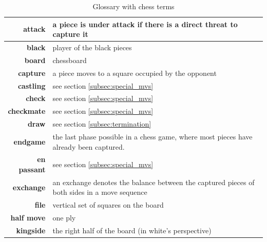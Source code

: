 \begin{table}[]
\centering
\caption{Glossary with chess terms}
\label{tab:gls}
\begin{tabular}{rL{10cm}}
\hline
\textbf{attack}       & a piece is under attack if there is a direct threat to capture it \\ \hline
\textbf{black}        & player of the black pieces                                       \\ \hline
\textbf{board}        & chessboard      \\                                                  \hline
\textbf{capture}      & a piece moves to a square occupied by the opponent              \\  \hline
\textbf{castling}     &  see section \ref{subsec:special_mvs}                                                                 \\ \hline
\textbf{check}        & see section \ref{subsec:special_mvs}                                                                  \\ \hline
\textbf{checkmate}    &   see section \ref{subsec:special_mvs}                                                                                                     \\\hline
\textbf{draw}         &  see section \ref{subsec:termination}                                                                 \\ \hline
\textbf{endgame}      &  the last phase possible in a chess game, where most pieces have already \newline been captured.                                                               \\ \hline
\textbf{en passant}   & see section \ref{subsec:special_mvs}                                                                  \\ \hline
\textbf{exchange}     & an exchange denotes the balance between the captured pieces of both sides in a move sequence                                                                  \\ \hline
\textbf{file}        &  vertical set of squares on the board                                                                \\ \hline
\textbf{half move}  &  one ply \\ \hline
\textbf{kingside}     &  the right half of the board (in white's perspective)                                                                 \\ \hline

\end{tabular}
\end{table}
